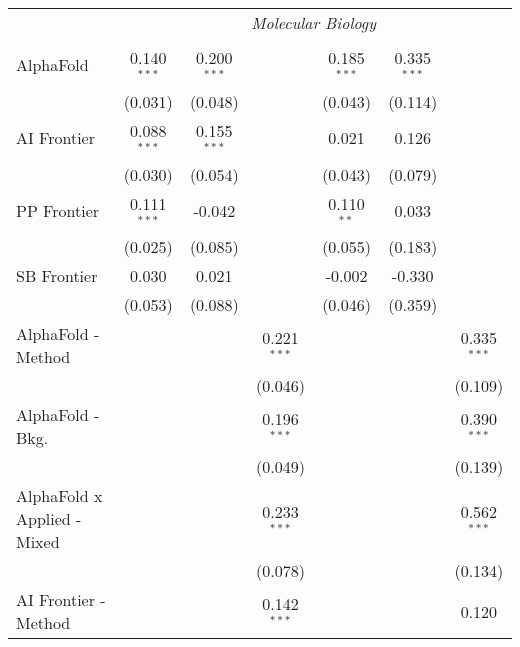 \begin{tabular}{lcccccc}
 & \multicolumn{6}{c}{\textit{Molecular Biology}} \\ \\
   AlphaFold                     & 0.140$^{***}$ & 0.200$^{***}$ &                & 0.185$^{***}$ & 0.335$^{***}$ &   \\   
                                 & (0.031)       & (0.048)       &                & (0.043)       & (0.114)       &   \\   
   AI Frontier                   & 0.088$^{***}$ & 0.155$^{***}$ &                & 0.021         & 0.126         &   \\   
                                 & (0.030)       & (0.054)       &                & (0.043)       & (0.079)       &   \\   
   PP Frontier                   & 0.111$^{***}$ & -0.042        &                & 0.110$^{**}$  & 0.033         &   \\   
                                 & (0.025)       & (0.085)       &                & (0.055)       & (0.183)       &   \\   
   SB Frontier                   & 0.030         & 0.021         &                & -0.002        & -0.330        &   \\   
                                 & (0.053)       & (0.088)       &                & (0.046)       & (0.359)       &   \\   
   AlphaFold - Method            &               &               & 0.221$^{***}$  &               &               & 0.335$^{***}$\\   
                                 &               &               & (0.046)        &               &               & (0.109)\\   
   AlphaFold - Bkg.              &               &               & 0.196$^{***}$  &               &               & 0.390$^{***}$\\   
                                 &               &               & (0.049)        &               &               & (0.139)\\   
   AlphaFold x Applied - Mixed   &               &               & 0.233$^{***}$  &               &               & 0.562$^{***}$\\   
                                 &               &               & (0.078)        &               &               & (0.134)\\   
   AI Frontier - Method          &               &               & 0.142$^{***}$  &               &               & 0.120\\   

\end{tabular}
